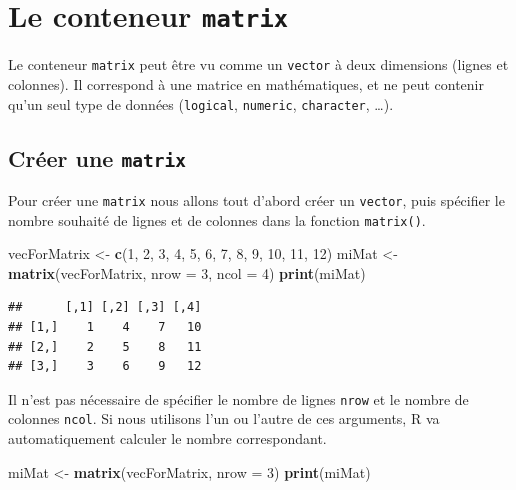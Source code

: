 \documentclass[
]{book}
\newenvironment{Shaded}{\begin{snugshade}}{\end{snugshade}}
\newcommand{\DataTypeTok}[1]{\textcolor[rgb]{0.13,0.29,0.53}{#1}}
\newcommand{\DecValTok}[1]{\textcolor[rgb]{0.00,0.00,0.81}{#1}}
\newcommand{\KeywordTok}[1]{\textcolor[rgb]{0.13,0.29,0.53}{\textbf{#1}}}
\newcommand{\NormalTok}[1]{#1}
\newcommand{\StringTok}[1]{\textcolor[rgb]{0.31,0.60,0.02}{#1}}
\begin{document}
\hypertarget{l014matrix}{%
\section{\texorpdfstring{Le conteneur \texttt{matrix}}{Le conteneur matrix}}\label{l014matrix}}

Le conteneur \texttt{matrix} peut être vu comme un \texttt{vector} à deux dimensions (lignes et colonnes). Il correspond à une matrice en mathématiques, et ne peut contenir qu'un seul type de données (\texttt{logical}, \texttt{numeric}, \texttt{character}, \ldots).

\hypertarget{cruxe9er-une-matrix}{%
\subsection{\texorpdfstring{Créer une \texttt{matrix}}{Créer une matrix}}\label{cruxe9er-une-matrix}}

Pour créer une \texttt{matrix} nous allons tout d'abord créer un \texttt{vector}, puis spécifier le nombre souhaité de lignes et de colonnes dans la fonction \texttt{matrix()}.

\begin{Shaded}
\begin{Highlighting}[]
\NormalTok{vecForMatrix <-}\StringTok{ }\KeywordTok{c}\NormalTok{(}\DecValTok{1}\NormalTok{, }\DecValTok{2}\NormalTok{, }\DecValTok{3}\NormalTok{, }\DecValTok{4}\NormalTok{, }\DecValTok{5}\NormalTok{, }\DecValTok{6}\NormalTok{, }\DecValTok{7}\NormalTok{, }\DecValTok{8}\NormalTok{, }\DecValTok{9}\NormalTok{, }\DecValTok{10}\NormalTok{, }\DecValTok{11}\NormalTok{, }\DecValTok{12}\NormalTok{)}
\NormalTok{miMat <-}\StringTok{ }\KeywordTok{matrix}\NormalTok{(vecForMatrix, }\DataTypeTok{nrow =} \DecValTok{3}\NormalTok{, }\DataTypeTok{ncol =} \DecValTok{4}\NormalTok{)}
\KeywordTok{print}\NormalTok{(miMat)}
\end{Highlighting}
\end{Shaded}

\begin{verbatim}
##      [,1] [,2] [,3] [,4]
## [1,]    1    4    7   10
## [2,]    2    5    8   11
## [3,]    3    6    9   12
\end{verbatim}

Il n'est pas nécessaire de spécifier le nombre de lignes \texttt{nrow} et le nombre de colonnes \texttt{ncol}. Si nous utilisons l'un ou l'autre de ces arguments, R va automatiquement calculer le nombre correspondant.

\begin{Shaded}
\begin{Highlighting}[]
\NormalTok{miMat <-}\StringTok{ }\KeywordTok{matrix}\NormalTok{(vecForMatrix, }\DataTypeTok{nrow =} \DecValTok{3}\NormalTok{)}
\KeywordTok{print}\NormalTok{(miMat)}
\end{Highlighting}
\end{Shaded}
\end{document}
